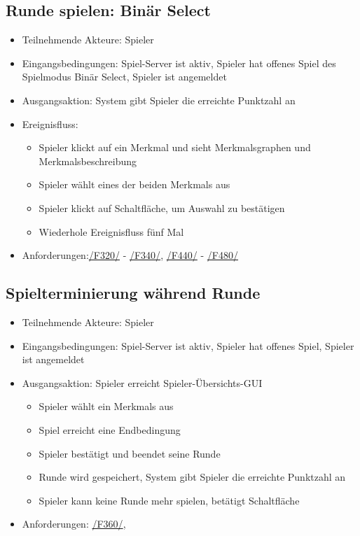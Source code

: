\documentclass[a4paper]{scrreprt}
\begin{document}
	\subsection{Runde spielen: Binär Select}
	\begin{itemize}
		\item Teilnehmende Akteure: \Gls{Spieler}

		\item Eingangsbedingungen: \Gls{Spiel-Server} ist aktiv, \Gls{Spieler} hat offenes \Gls{Spiel} des \Gls{Spielmodus} Binär Select, \Gls{Spieler} ist angemeldet
        \item Ausgangsaktion: System gibt \Gls{Spieler} die erreichte Punktzahl an
		\item Ereignisfluss:
		\begin{itemize}
			\item \Gls{Spieler} klickt auf ein \Gls{Merkmal} und sieht Merkmalsgraphen und Merkmalsbeschreibung
			\item \Gls{Spieler} wählt eines der beiden \Glspl{Merkmal} aus
			\item \Gls{Spieler} klickt auf Schaltfläche, um Auswahl zu bestätigen
            \item Wiederhole Ereignisfluss fünf Mal
		\end{itemize}
        \item Anforderungen:\hyperlink{F320}{/F320/} - \hyperlink{F340}{/F340/}, \hyperlink{F440}{/F440/} - \hyperlink{F480}{/F480/}
	\end{itemize}

	\subsection{Spielterminierung während Runde}
	\begin{itemize}
		\item Teilnehmende Akteure: \Gls{Spieler}
		\item Eingangsbedingungen: \Gls{Spiel-Server} ist aktiv, \Gls{Spieler} hat offenes \Gls{Spiel}, \Gls{Spieler} ist angemeldet
		\item Ausgangsaktion: \Gls{Spieler} erreicht Spieler-Übersichts-GUI
		\begin{itemize}
			\item \Gls{Spieler} wählt ein \Glspl{Merkmal} aus
			\item \Gls{Spiel} erreicht eine Endbedingung
			\item \Gls{Spieler} bestätigt und beendet seine Runde
			\item Runde wird gespeichert, System gibt \Gls{Spieler} die erreichte Punktzahl an
			\item \Gls{Spieler} kann keine Runde mehr spielen, betätigt Schaltfläche %
		\end{itemize}
		\item Anforderungen: \hyperlink{F360}{/F360/},
	\end{itemize}
\end{document}
